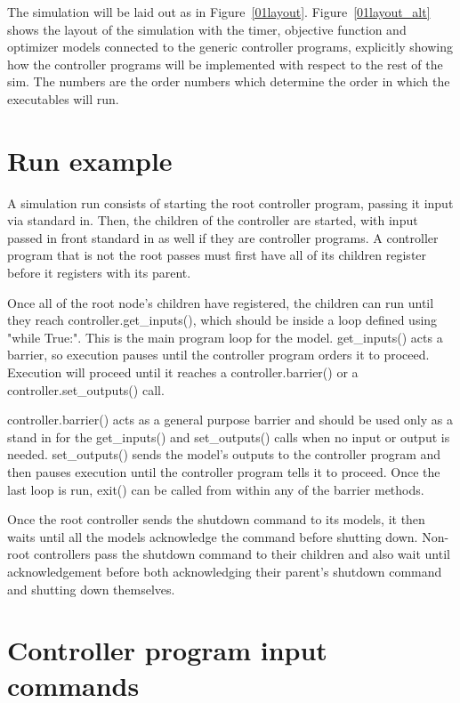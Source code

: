 \documentclass{book}
\begin{document}
The simulation will be laid out as in Figure~\ref{01layout}. Figure~\ref{01layout_alt} shows the layout of the simulation with the timer, objective function and optimizer models connected to the generic controller programs, explicitly showing how the controller programs will be implemented with respect to the rest of the sim. The numbers are the order numbers which determine the order in which the executables will run.

\section{Run example}

A simulation run consists of starting the root controller program, passing it input via standard in. Then, the children of the controller are started, with input passed in front standard in as well if they are controller programs. A controller program that is not the root passes must first have all of its children register before it registers with its parent. 

Once all of the root node's children have registered, the children can run until they reach controller.get\_inputs(), which should be inside a loop defined using  "while True:". This is the main program loop for the model.  get\_inputs() acts a barrier, so execution pauses until the controller program orders it to proceed. Execution will proceed until it reaches a controller.barrier() or a controller.set\_outputs() call.

controller.barrier() acts as a general purpose barrier and should be used only as a stand in for the get\_inputs() and set\_outputs() calls when no input or output is needed. set\_outputs() sends the model's outputs to the controller program and then pauses execution until the controller program tells it to proceed. Once the last loop is run, exit() can be called from within any of the barrier methods.

Once the root controller sends the shutdown command to its models, it then waits until all the models acknowledge the command before shutting down. Non-root controllers pass the shutdown command to their children and also wait until acknowledgement before both acknowledging their parent's shutdown command and shutting down themselves.

\section{Controller program input commands}
\end{document}
